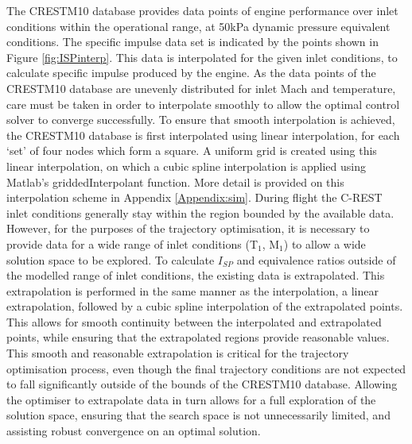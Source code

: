The \textsf{CRESTM10} database provides data points of engine performance over inlet conditions within the operational range, at 50kPa dynamic pressure equivalent conditions. The specific impulse data set is indicated by the points shown in Figure \ref{fig:ISPinterp}. This data is interpolated for the given inlet conditions, to calculate specific impulse produced by the engine. As the data points of the \textsf{CRESTM10} database are unevenly distributed for inlet Mach and temperature, care must be taken in order to interpolate smoothly to allow the optimal control solver to converge successfully. To ensure that smooth interpolation is achieved, the \textsf{CRESTM10} database is first interpolated using linear interpolation, for each `set' of four nodes which form a square. A uniform grid is created using this linear interpolation, on which a cubic spline interpolation is applied using Matlab's \textsf{griddedInterpolant} function. More detail is provided on this interpolation scheme in Appendix \ref{Appendix:sim}. During flight the C-REST inlet conditions generally stay within the region bounded by the available data. However, for the purposes of the trajectory optimisation, it is necessary to provide data for a wide range of inlet conditions (T$_1$, M$_1$) to allow a wide solution space to be explored. To calculate $I_{SP}$ and equivalence ratios outside of the modelled range of inlet conditions, the existing data is extrapolated. This extrapolation is performed in the same manner as the interpolation, a linear extrapolation, followed by a cubic spline interpolation of the extrapolated points. This allows for smooth continuity between the interpolated and extrapolated points, while ensuring that the extrapolated regions provide reasonable values. This smooth and reasonable extrapolation is critical for the trajectory optimisation process, even though the final trajectory conditions are not expected to fall significantly outside of the bounds of the \textsf{CRESTM10} database. Allowing the optimiser to extrapolate data in turn allows for a full exploration of the solution space, ensuring that the search space is not unnecessarily limited, and assisting robust convergence on an optimal solution. 

